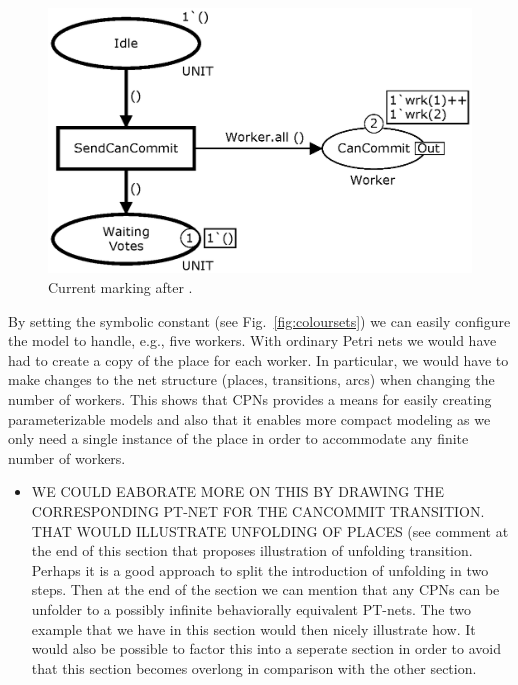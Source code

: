 \begin{figure}[h]
\centering
\includegraphics[scale=.5]{figures/SendCanCommit.eps}
\caption{Current marking after .}
\label{fig:sendcancommit}
\end{figure}


By setting the symbolic constant  (see
Fig.~\ref{fig:coloursets}) we can easily configure the model to handle,
e.g., five workers. With ordinary Petri nets we would have had to
create a copy of the  place for each worker. In
particular, we would have to make changes to the net structure
(places, transitions, arcs) when changing the number of workers. This
shows that CPNs provides a means for easily creating parameterizable
models and also that it enables more compact modeling as we only need
a single instance of the  place in order to
accommodate any finite number of workers. 

\begin{itemize}
\item WE COULD EABORATE MORE ON THIS BY DRAWING THE CORRESPONDING
  PT-NET FOR THE CANCOMMIT TRANSITION. THAT WOULD ILLUSTRATE UNFOLDING
  OF PLACES (see comment at the end of this section that proposes
  illustration of unfolding transition. Perhaps it is a good approach
  to split the introduction of unfolding in two steps. Then at the end
  of the section we can mention that any CPNs can be unfolder to a
  possibly infinite behaviorally equivalent PT-nets. The two example
  that we have in this section would then nicely illustrate how. It
  would also be possible to factor this into a seperate section in
  order to avoid that this section becomes overlong in comparison with
  the other section.  
\end{itemize}

